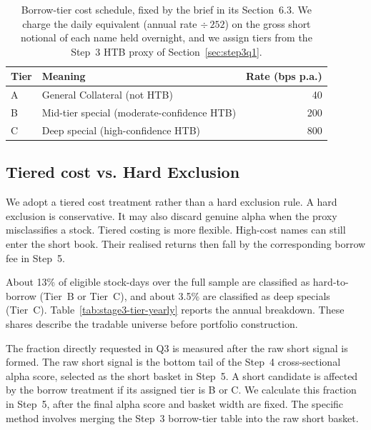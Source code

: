 \documentclass[12pt]{article}
\begin{document}
\begin{table}[ht]
  \centering
  \begin{tabular}{llr}
    \toprule
    Tier & Meaning & Rate (bps p.a.) \\
    \midrule
    A & General Collateral (not HTB)               & 40  \\
    B & Mid-tier special (moderate-confidence HTB)  & 200 \\
    C & Deep special (high-confidence HTB)          & 800 \\
    \bottomrule
  \end{tabular}
  \caption{Borrow-tier cost schedule, fixed by the brief in its Section~6.3. We charge the daily equivalent (annual rate $\div\,252$) on the gross
  short notional of each name held overnight, and we assign tiers from the
  Step~3 HTB proxy of Section~\ref{sec:step3q1}.}
  \label{tab:step3-tiers}
\end{table}

\subsection{Tiered cost vs. Hard Exclusion}

We adopt a tiered cost treatment rather than a hard exclusion rule. A hard exclusion is conservative. It may also discard genuine alpha when the proxy misclassifies a stock. Tiered costing is more flexible. High-cost names can still enter the short book. Their realised returns then fall by the corresponding borrow fee in Step~5.

About 13\% of eligible stock-days over the full sample are classified as hard-to-borrow (Tier~B or Tier~C), and about 3.5\% are classified as deep specials (Tier~C). Table~\ref{tab:stage3-tier-yearly} reports the annual breakdown. These shares describe the tradable universe before portfolio construction.

The fraction directly requested in Q3 is measured after the raw short signal is formed. The raw short signal is the bottom tail of the Step~4 cross-sectional alpha score, selected as the short basket in Step~5. A short candidate is affected by the borrow treatment if its assigned tier is B or C. We calculate this fraction in Step~5, after the final alpha score and basket width are fixed. The specific method involves merging the Step~3 borrow-tier table into the raw short basket.
\end{document}

